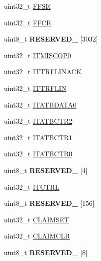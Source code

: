 \begin{DoxyCompactItemize}
\item 
uint32\+\_\+t \hyperlink{struct_e_t_b___mem_map_a329d4e3cc86aa6064657bb9a37096e31}{F\+F\+S\+R}
\item 
uint32\+\_\+t \hyperlink{struct_e_t_b___mem_map_a80b6d342085b83ee0a5ede7f9651bd59}{F\+F\+C\+R}
\item 
\hypertarget{struct_e_t_b___mem_map_abffdab89f762147b34364c85891e3798}{}uint8\+\_\+t {\bfseries R\+E\+S\+E\+R\+V\+E\+D\+\_} \mbox{[}3032\mbox{]}\label{struct_e_t_b___mem_map_abffdab89f762147b34364c85891e3798}

\item 
uint32\+\_\+t \hyperlink{struct_e_t_b___mem_map_acdc0e8395d63098ffbbaa63cc05ceb7e}{I\+T\+M\+I\+S\+C\+O\+P0}
\item 
uint32\+\_\+t \hyperlink{struct_e_t_b___mem_map_a136987669379af39a12062922fee39b1}{I\+T\+T\+R\+F\+L\+I\+N\+A\+C\+K}
\item 
uint32\+\_\+t \hyperlink{struct_e_t_b___mem_map_a15ffb02eb23af7c4ee5a13922f3f5d37}{I\+T\+T\+R\+F\+L\+I\+N}
\item 
uint32\+\_\+t \hyperlink{struct_e_t_b___mem_map_a7dfaed9b0dca763ce269813543c7bf83}{I\+T\+A\+T\+B\+D\+A\+T\+A0}
\item 
uint32\+\_\+t \hyperlink{struct_e_t_b___mem_map_a1c0bbc031154c0fb2c335b4cffadb9e5}{I\+T\+A\+T\+B\+C\+T\+R2}
\item 
uint32\+\_\+t \hyperlink{struct_e_t_b___mem_map_af2f4b9c2591e22c26c35cf21bf023f32}{I\+T\+A\+T\+B\+C\+T\+R1}
\item 
uint32\+\_\+t \hyperlink{struct_e_t_b___mem_map_a9da4a06848bfc47161b31c234eaaeb81}{I\+T\+A\+T\+B\+C\+T\+R0}
\item 
\hypertarget{struct_e_t_b___mem_map_ad1a44df29bbfeb34b98e897fb3a96727}{}uint8\+\_\+t {\bfseries R\+E\+S\+E\+R\+V\+E\+D\+\_} \mbox{[}4\mbox{]}\label{struct_e_t_b___mem_map_ad1a44df29bbfeb34b98e897fb3a96727}

\item 
uint32\+\_\+t \hyperlink{struct_e_t_b___mem_map_acf9a92d3db15cc318551da316524d21b}{I\+T\+C\+T\+R\+L}
\item 
\hypertarget{struct_e_t_b___mem_map_a38ee5f6fef6fdbd3d1949aefceabd6f8}{}uint8\+\_\+t {\bfseries R\+E\+S\+E\+R\+V\+E\+D\+\_} \mbox{[}156\mbox{]}\label{struct_e_t_b___mem_map_a38ee5f6fef6fdbd3d1949aefceabd6f8}

\item 
uint32\+\_\+t \hyperlink{struct_e_t_b___mem_map_a86f547f97e9ad1895c1fb03ae9c25931}{C\+L\+A\+I\+M\+S\+E\+T}
\item 
uint32\+\_\+t \hyperlink{struct_e_t_b___mem_map_a0cb75f3c7b540c1f7745a67001822749}{C\+L\+A\+I\+M\+C\+L\+R}
\item 
\hypertarget{struct_e_t_b___mem_map_aac0012148db41cb0e48e5cbc06a70f7c}{}uint8\+\_\+t {\bfseries R\+E\+S\+E\+R\+V\+E\+D\+\_} \mbox{[}8\mbox{]}\label{struct_e_t_b___mem_map_aac0012148db41cb0e48e5cbc06a70f7c}


\end{DoxyCompactItemize}
